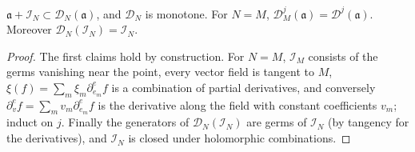 \begin{lemma}
\label{mc:derivative-along-basic}
\leanok
\(\mathfrak a+\mathcal I_N\subset\mathcal D_N(\mathfrak a)\), and \(\mathcal D_N\) is monotone. For \(N=M\), \(\mathcal D_M^j(\mathfrak a)=\mathcal D^j(\mathfrak a)\). Moreover
\(\mathcal D_N(\mathcal I_N)=\mathcal I_N\).
\end{lemma}
\begin{proof}
\leanok
The first claims hold by construction. For \(N=M\), \(\mathcal I_M\) consists of the germs vanishing near the point, every vector field is tangent to
\(M\), \(\xi(f)=\sum_m\xi_m\partial^e_{e_m}f\) is a combination of partial derivatives, and conversely \(\partial^e_vf=\sum_mv_m\partial^e_{e_m}f\) is the derivative
along the field with constant coefficients \(v_m\); induct on \(j\). Finally the generators of \(\mathcal D_N(\mathcal I_N)\) are germs of \(\mathcal I_N\) (by tangency for
the derivatives), and \(\mathcal I_N\) is closed under holomorphic combinations.
\end{proof}

